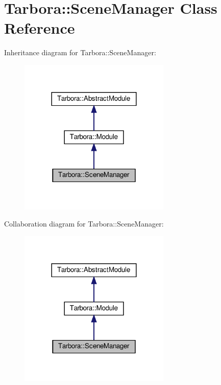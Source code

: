 \hypertarget{classTarbora_1_1SceneManager}{}\section{Tarbora\+:\+:Scene\+Manager Class Reference}
\label{classTarbora_1_1SceneManager}


Inheritance diagram for Tarbora\+:\+:Scene\+Manager\+:\nopagebreak
\begin{figure}[H]
\begin{center}
\leavevmode
\includegraphics[width=204pt]{classTarbora_1_1SceneManager__inherit__graph}
\end{center}
\end{figure}


Collaboration diagram for Tarbora\+:\+:Scene\+Manager\+:\nopagebreak
\begin{figure}[H]
\begin{center}
\leavevmode
\includegraphics[width=204pt]{classTarbora_1_1SceneManager__coll__graph}
\end{center}
\end{figure}
